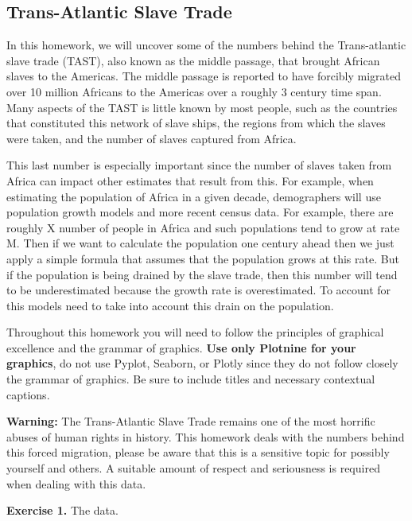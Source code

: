 \documentclass[11pt]{article}
\begin{document}
    \subsection{Trans-Atlantic Slave
Trade}\label{trans-atlantic-slave-trade}

In this homework, we will uncover some of the numbers behind the
Trans-atlantic slave trade (TAST), also known as the middle passage,
that brought African slaves to the Americas. The middle passage is
reported to have forcibly migrated over 10 million Africans to the
Americas over a roughly 3 century time span. Many aspects of the TAST is
little known by most people, such as the countries that constituted this
network of slave ships, the regions from which the slaves were taken,
and the number of slaves captured from Africa.

This last number is especially important since the number of slaves
taken from Africa can impact other estimates that result from this. For
example, when estimating the population of Africa in a given decade,
demographers will use population growth models and more recent census
data. For example, there are roughly X number of people in Africa and
such populations tend to grow at rate M. Then if we want to calculate
the population one century ahead then we just apply a simple formula
that assumes that the population grows at this rate. But if the
population is being drained by the slave trade, then this number will
tend to be underestimated because the growth rate is overestimated. To
account for this models need to take into account this drain on the
population.

Throughout this homework you will need to follow the principles of
graphical excellence and the grammar of graphics. \textbf{Use only
Plotnine for your graphics}, do not use Pyplot, Seaborn, or Plotly since
they do not follow closely the grammar of graphics. Be sure to include
titles and necessary contextual captions.

\textbf{Warning:} The Trans-Atlantic Slave Trade remains one of the most
horrific abuses of human rights in history. This homework deals with the
numbers behind this forced migration, please be aware that this is a
sensitive topic for possibly yourself and others. A suitable amount of
respect and seriousness is required when dealing with this data.

    \textbf{Exercise 1.} The data.
\end{document}
